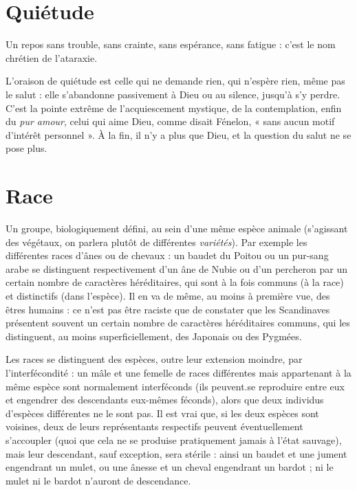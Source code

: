 \section{Quiétude}
Un repos sans trouble, sans crainte, sans espérance, sans fatigue :
c’est le nom chrétien de l’ataraxie.

L’oraison de quiétude est celle qui ne demande rien, qui n’espère rien,
même pas le salut : elle s’abandonne passivement à Dieu ou au silence, jusqu’à
s’y perdre. C’est la pointe extrême de l’acquiescement mystique, de la contemplation,
enfin du {\it pur amour}, celui qui aime Dieu, comme disait Fénelon, « sans
aucun motif d'intérêt personnel ». À la fin, il n’y a plus que Dieu, et la question
du salut ne se pose plus.

\section{Race}
Un groupe, biologiquement défini, au sein d’une même espèce animale
(s'agissant des végétaux, on parlera plutôt de différentes
{\it variétés}). Par exemple les différentes races d’ânes ou de chevaux : un baudet du
Poitou ou un pur-sang arabe se distinguent respectivement d’un âne de Nubie
ou d’un percheron par un certain nombre de caractères héréditaires, qui sont à
la fois communs (à la race) et distinctifs (dans l’espèce). Il en va de même, au
moins à première vue, des êtres humains : ce n’est pas être raciste que de constater
que les Scandinaves présentent souvent un certain nombre de caractères
héréditaires communs, qui les distinguent, au moins superficiellement, des
Japonais ou des Pygmées.

Les races se distinguent des espèces, outre leur extension moindre, par
l’interfécondité : un mâle et une femelle de races différentes mais appartenant
à la même espèce sont normalement interféconds (ils peuvent.se reproduire
entre eux et engendrer des descendants eux-mêmes féconds), alors que deux
individus d’espèces différentes ne le sont pas. Il est vrai que, si les deux espèces
sont voisines, deux de leurs représentants respectifs peuvent éventuellement
s’accoupler (quoi que cela ne se produise pratiquement jamais à l’état sauvage),
mais leur descendant, sauf exception, sera stérile : ainsi un baudet et une
jument engendrant un mulet, ou une ânesse et un cheval engendrant un
bardot ; ni le mulet ni le bardot n’auront de descendance.

